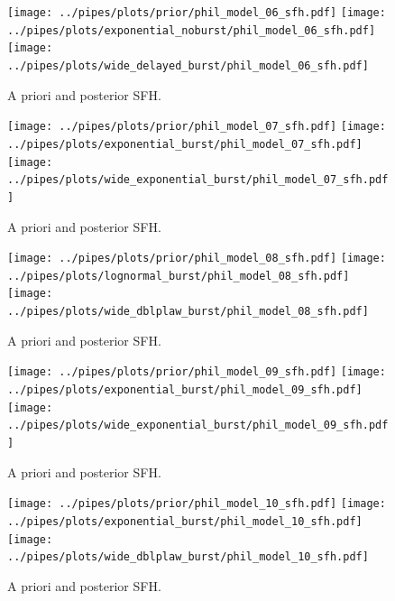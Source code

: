 \documentclass[a4paper,11pt]{article}
\begin{document}
\newpage
\begin{figure}[h!]
  \centering
  \texttt{[image: ../pipes/plots/prior/phil\_model\_06\_sfh.pdf]}
  \texttt{[image: ../pipes/plots/exponential\_noburst/phil\_model\_06\_sfh.pdf]}
  \texttt{[image: ../pipes/plots/wide\_delayed\_burst/phil\_model\_06\_sfh.pdf]}
  \caption{A priori and posterior SFH.}
  \label{}
\end{figure}

\newpage
\begin{figure}[h!]
  \centering
  \texttt{[image: ../pipes/plots/prior/phil\_model\_07\_sfh.pdf]}
  \texttt{[image: ../pipes/plots/exponential\_burst/phil\_model\_07\_sfh.pdf]}
  \texttt{[image: ../pipes/plots/wide\_exponential\_burst/phil\_model\_07\_sfh.pdf]}
  \caption{A priori and posterior SFH.}
  \label{}
\end{figure}

\newpage
\begin{figure}[h!]
  \centering
  \texttt{[image: ../pipes/plots/prior/phil\_model\_08\_sfh.pdf]}
  \texttt{[image: ../pipes/plots/lognormal\_burst/phil\_model\_08\_sfh.pdf]}
  \texttt{[image: ../pipes/plots/wide\_dblplaw\_burst/phil\_model\_08\_sfh.pdf]}
  \caption{A priori and posterior SFH.}
  \label{}
\end{figure}

\newpage
\begin{figure}[h!]
  \centering
  \texttt{[image: ../pipes/plots/prior/phil\_model\_09\_sfh.pdf]}
  \texttt{[image: ../pipes/plots/exponential\_burst/phil\_model\_09\_sfh.pdf]}
  \texttt{[image: ../pipes/plots/wide\_exponential\_burst/phil\_model\_09\_sfh.pdf]}
  \caption{A priori and posterior SFH.}
  \label{}
\end{figure}

\newpage
\begin{figure}[h!]
  \centering
  \texttt{[image: ../pipes/plots/prior/phil\_model\_10\_sfh.pdf]}
  \texttt{[image: ../pipes/plots/exponential\_burst/phil\_model\_10\_sfh.pdf]}
  \texttt{[image: ../pipes/plots/wide\_dblplaw\_burst/phil\_model\_10\_sfh.pdf]}
  \caption{A priori and posterior SFH.}
  \label{}
\end{figure}
\end{document}
